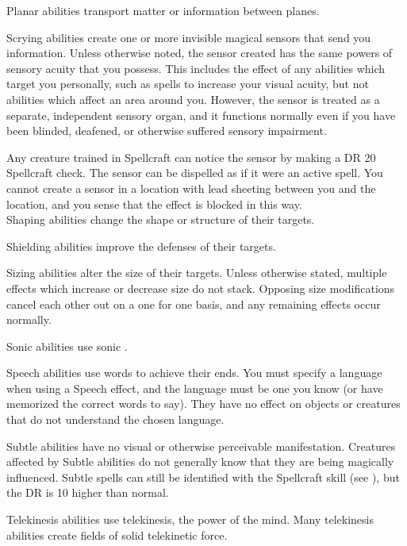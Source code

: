      Planar abilities transport matter or information between planes.

     Scrying abilities create one or more invisible magical sensors that send you information.
    Unless otherwise noted, the sensor created has the same powers of sensory acuity that you possess.
    This includes the effect of any abilities which target you personally, such as spells to increase your visual acuity, but not abilities which affect an area around you.
    However, the sensor is treated as a separate, independent sensory organ, and it functions normally even if you have been blinded, deafened, or otherwise suffered sensory impairment.
    \par Any creature trained in Spellcraft can notice the sensor by making a DR 20 Spellcraft check.
    The sensor can be dispelled as if it were an active spell.
    You cannot create a sensor in a location with lead sheeting between you and the location, and you sense that the effect is blocked in this way.
    \\

     Shaping abilities change the shape or structure of their targets.

     Shielding abilities improve the defenses of their targets.

     Sizing abilities alter the size of their targets.
    Unless otherwise stated, multiple effects which increase or decrease size do not stack.
    Opposing size modifications cancel each other out on a one for one basis, and any remaining effects occur normally.

     Sonic abilities use sonic .

     Speech abilities use words to achieve their ends.
    You must specify a language when using a Speech effect, and the language must be one you know (or have memorized the correct words to say). They have no effect on objects or creatures that do not understand the chosen language.

     Subtle abilities have no visual or otherwise perceivable manifestation.
    Creatures affected by Subtle abilities do not generally know that they are being magically influenced.
    Subtle spells can still be identified with the Spellcraft skill (see ), but the DR is 10 higher than normal.

     Telekinesis abilities use telekinesis, the power of the mind.
    Many telekinesis abilities create fields of solid telekinetic force.

